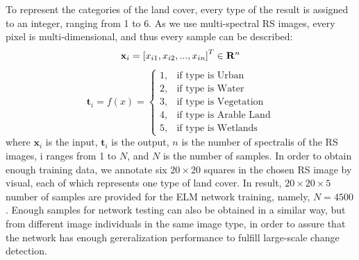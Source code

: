 \documentclass{elsart}
\begin{document}
To represent the categories of the land cover, every type of the result is assigned to an integer, ranging from 1 to 6.
As we use multi-spectral RS images, every pixel is multi-dimensional, and thus every sample can be described:
$$
\mathbf{x}_i=\left[x_{i1},x_{i2},...,x_{in}  \right]^T \in \mathbf{R}^n  \\
$$
$$
\mathbf{t}_i = f(x) = 
	\begin{cases} 
	1, & \mbox{if type is Urban} \\ 
	2, & \mbox{if type is Water} \\
	3, & \mbox{if type is Vegetation} \\
	4, & \mbox{if type is Arable Land} \\
	5, & \mbox{if type is Wetlands} 
	\end{cases}
$$
where $\mathbf{x}_i$ is the input, $\mathbf{t}_i$ is the output, $n$ is the number of spectralis of the RS images, i ranges from 1 to $N$, and $N$ is the number of samples.
In order to obtain enough training data, we annotate six $20\times20$ squares in the chosen RS image by visual, each of which represents one type of land cover.
In result, $20\times20\times5$ number of samples are provided for the ELM network training, namely, $N=4500$.
Enough samples for network testing can also be obtained in a similar way, but from different image individuals in the same image type, in order to assure that the network has enough gereralization performance to fulfill large-scale change detection. 
\par
\end{document}
